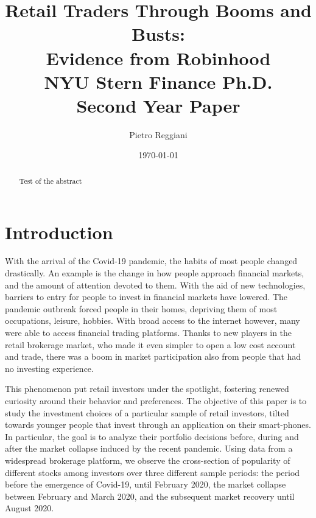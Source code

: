 \documentclass[12pt]{article}
\numberwithin{equation}{section} %
\begin{document}
 
 
\title{ Retail Traders Through Booms and Busts: \\ \vspace{1mm}
 Evidence from Robinhood \\ \vspace{7mm} \small NYU Stern Finance Ph.D. \\ Second Year Paper}
\author{Pietro Reggiani}
\date{\today}
 
\maketitle

\begin{abstract}
Test of the abstract
\end{abstract}

\newpage

\tableofcontents

\newpage


\section{Introduction}

With the arrival of the Covid-19 pandemic, the habits of most people changed drastically. An example is the change in how people approach financial markets, and the amount of attention devoted to them. With the aid of new technologies, barriers to entry for people to invest in financial markets have lowered. The pandemic outbreak forced people in their homes, depriving them of most occupations, leisure, hobbies. With broad access to the internet however, many were able to access financial trading platforms. Thanks to new players in the retail brokerage market, who made it even simpler to open a low cost account and trade, there was a boom in market participation also from people that had no investing experience.

This phenomenon put retail investors under the spotlight, fostering renewed curiosity around their behavior and preferences. The objective of this paper is to study the investment choices of a particular sample of retail investors, tilted towards younger people that invest through an application on their smart-phones. In particular, the goal is to analyze their portfolio decisions before, during and after the market collapse induced by the recent pandemic. Using data from a widespread brokerage platform, we observe the cross-section of popularity of different stocks among investors over three different sample periods: the period before the emergence of Covid-19, until February 2020, the market collapse between February and March 2020, and the subsequent market recovery until August 2020.
\end{document}
